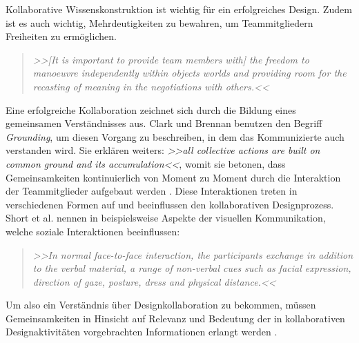 \medskip Kollaborative Wissenskonstruktion ist wichtig für ein erfolgreiches Design. Zudem ist es auch wichtig, Mehrdeutigkeiten zu bewahren, um Teammitgliedern Freiheiten zu ermöglichen.

\begin{quote}
	\textsl{>>[It is important to provide team members with] the freedom to manoeuvre independently within objects worlds and providing room for the recasting of meaning in the negotiations with others.<<}
\begin{flushright}\citep{Bucciarelli:1994}\end{flushright}
\end{quote}

\medskip Eine erfolgreiche Kollaboration zeichnet sich durch die Bildung eines gemeinsamen Verständnisses aus. Clark und Brennan benutzen den Begriff \emph{Grounding}, um diesen Vorgang zu beschreiben, in dem das Kommunizierte auch verstanden wird. Sie erklären weiters: \emph{>>all collective actions are built on common ground and its accumulation<<}, womit sie betonen, dass Gemeinsamkeiten kontinuierlich von Moment zu Moment durch die Interaktion der Teammitglieder aufgebaut werden \citep{Clark:1991}. Diese Interaktionen treten in verschiedenen Formen auf und beeinflussen den kollaborativen Designprozess. Short et al. nennen in \citep{Short:1991} beispielsweise Aspekte der visuellen Kommunikation, welche soziale Interaktionen beeinflussen: 

\begin{quote}
	\textsl{>>In normal face-to-face interaction, the participants exchange in addition to the verbal material, a range of non-verbal cues such as facial expression, direction of gaze, posture, dress and physical distance.<<}
\begin{flushright}\citep{Short:1991}\end{flushright}
\end{quote}

Um also ein Verständnis über Designkollaboration zu bekommen, müssen Gemeinsamkeiten in Hinsicht auf Relevanz und Bedeutung der in kollaborativen Designaktivitäten vorgebrachten Informationen erlangt werden \citep{Hill:2001}.


